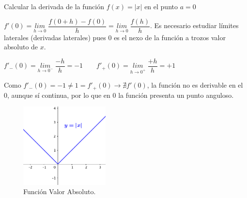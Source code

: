 	\begin{ejem} Calcular la derivada de la función $f(x)=|x|$ en el punto $a=0$
		
	\begin{multicols}{2}
		

	$f'(0)=\underset{h\to 0}{lim}\;{\dfrac {f(0+h)-f(0)} {h}}=\underset {h\to 0}{lim}\; {\dfrac {f(h)}{h}}$. Es necesario estudiar límites laterales (derivadas laterales) pues $0$ es el nexo de la función a trozos valor absoluto de $x$.
	
	$f'_-(0)=\underset{h\to 0^-}{lim}\;{\dfrac {-h}{h}}=-1 \qquad f'_+(0)=\underset{h\to 0^+}{lim}\;{\dfrac {+h}{h}}=+1$
	
	Como $f'_-(0)=-1\neq 1=f'_+(0) \to \nexists f'(0)$, la función no es derivable en el $0$, aunque sí continua, por lo que en $0$ la función presenta un punto anguloso.
	
	\begin{figure}[H]
			\centering
			\includegraphics[width=0.4\textwidth]{imagenes/imagenes04/T04IM04.png}
			\caption{Función Valor Absoluto.}
		\end{figure}
		
	\end{multicols}
	
	\end{ejem}
	
